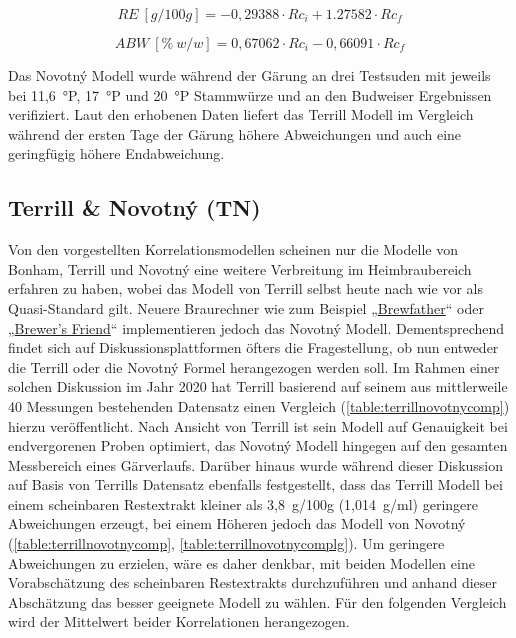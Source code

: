 \documentclass[a4paper,parskip=half]{scrartcl}
\newcommand{\bxic}{\mathit{Rc}_i}
\newcommand{\bxfc}{\mathit{Rc}_f}
\newcommand{\abw}{\mathit{ABW}}
\newcommand{\rex}{\mathit{RE}}
\begin{document}
\begin{equation}
\rex\:[g/100g] = -0,29388 \cdot \bxic + 1.27582 \cdot \bxfc
\label{eq:novotnyre}
\end{equation}

\begin{equation}
\abw\:[\%\:w/w] = 0,67062 \cdot \bxic - 0,66091 \cdot \bxfc
\label{eq:novotnyabw}
\end{equation}

Das Novotný Modell wurde während der Gärung an drei Testsuden mit jeweils
bei 11,6~°P, 17~°P und 20~°P Stammwürze und an den Budweiser
Ergebnissen verifiziert. Laut den erhobenen Daten liefert das Terrill
Modell im Vergleich während der ersten Tage der Gärung höhere
Abweichungen und auch eine geringfügig höhere Endabweichung.
\parencites{Novotny2017a}{Novotny2017}

\subsection*{Terrill \& Novotný (TN)}

Von den vorgestellten Korrelationsmodellen scheinen nur die
Modelle von Bonham, Terrill und Novotný eine weitere Verbreitung im Heimbraubereich erfahren zu haben, wobei das Modell von Terrill selbst
heute nach wie vor als Quasi-Standard gilt. Neuere Braurechner
wie zum Beispiel „\href{https://brewfather.app}{Brewfather}“
oder „\href{https://www.brewersfriend.com/refractometer-calculator}
{Brewer's Friend}“ implementieren jedoch das Novotný Modell.
Dementsprechend findet sich auf Diskussionsplattformen öfters die Fragestellung, ob nun
entweder die Terrill oder die Novotný Formel herangezogen werden
soll. Im Rahmen einer solchen Diskussion im Jahr 2020 hat Terrill
basierend auf seinem aus mittlerweile 40 Messungen bestehenden Datensatz
einen Vergleich (\autoref{table:terrillnovotnycomp}) hierzu veröffentlicht.
Nach Ansicht von Terrill ist sein Modell auf Genauigkeit bei endvergorenen
Proben optimiert, das Novotný Modell hingegen auf den gesamten
Messbereich eines Gärverlaufs. Darüber hinaus wurde während dieser Diskussion
auf Basis von Terrills Datensatz ebenfalls festgestellt, dass das
Terrill Modell bei einem scheinbaren Restextrakt kleiner als 3,8~g/100g 
(1,014~g/ml) geringere Abweichungen erzeugt, bei einem Höheren jedoch
das Modell von Novotný (\autoref{table:terrillnovotnycomp},
\autoref{table:terrillnovotnycomplg}). Um geringere Abweichungen zu
erzielen, wäre es
daher denkbar, mit beiden Modellen eine Vorabschätzung des scheinbaren Restextrakts durchzuführen und anhand dieser Abschätzung das besser
geeignete Modell zu wählen. Für den folgenden Vergleich wird der
Mittelwert beider Korrelationen herangezogen. \parencite{h22lude2020}
\end{document}
